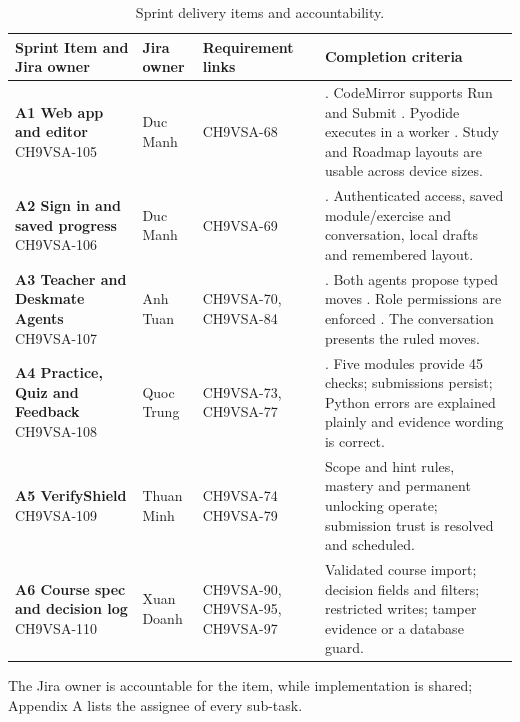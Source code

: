 \documentclass[11pt,a4paper]{article}
\begin{document}
{\small
\begin{longtable}{>{\raggedright\arraybackslash}p{}>{\raggedright\arraybackslash}p{}>{\raggedright\arraybackslash}p{}>{\raggedright\arraybackslash}p{}}
\caption{Sprint delivery items and accountability.}\\
\toprule
\textbf{Sprint Item and Jira owner} & \textbf{Jira owner} & \textbf{Requirement links} & \textbf{Completion criteria} \\
\midrule
\endhead
\textbf{A1 Web app and editor} \newline CH9VSA-105 & Duc Manh & CH9VSA-68 & 1. CodeMirror supports Run and Submit \newline 2. Pyodide executes in a worker \newline 3. Study and Roadmap layouts are usable across device sizes. \\
\textbf{A2 Sign in and saved progress} \newline CH9VSA-106 & Duc Manh & CH9VSA-69 & 1. Authenticated access, saved module/exercise and conversation, local drafts and remembered layout. \\
\textbf{A3 Teacher and Deskmate Agents} \newline CH9VSA-107 & Anh Tuan & CH9VSA-70, CH9VSA-84 & 1. Both agents propose typed moves \newline 2. Role permissions are enforced \newline 3. The conversation presents the ruled moves. \\
\textbf{A4 Practice, Quiz and Feedback} \newline CH9VSA-108 & Quoc Trung & CH9VSA-73, CH9VSA-77 & 1. Five modules provide 45 checks; submissions persist; Python errors are explained plainly and evidence wording is correct. \\
\textbf{A5 VerifyShield} \newline CH9VSA-109 & Thuan Minh & CH9VSA-74  CH9VSA-79 & Scope and hint rules, mastery and permanent unlocking operate; submission trust is resolved and scheduled. \\
\textbf{A6 Course spec and decision log} \newline CH9VSA-110 & Xuan Doanh & CH9VSA-90, CH9VSA-95, CH9VSA-97 & Validated course import; decision fields and filters; restricted writes; tamper evidence or a database guard. \\
\bottomrule
\end{longtable}}
The Jira owner is accountable for the item, while implementation is shared; Appendix A lists the assignee of every sub-task.
\end{document}
